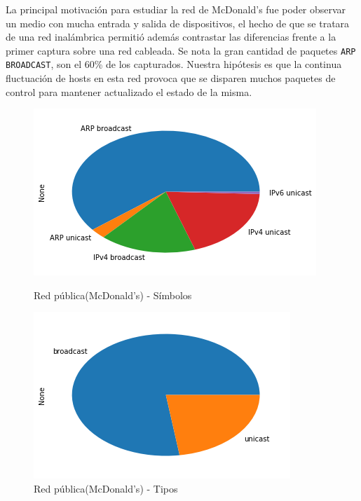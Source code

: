 La principal motivación para estudiar la red de McDonald's fue poder observar un medio con mucha entrada y salida de dispositivos, el hecho de que se tratara de una red inalámbrica permitió además contrastar las diferencias frente a la primer captura sobre una red cableada. Se nota la gran cantidad de paquetes \texttt{ARP BROADCAST}, son el 60\% de los capturados. Nuestra hipótesis es que la continua fluctuación de hosts en esta red provoca que se disparen muchos paquetes de control para mantener actualizado el estado de la misma.

\begin{figure}[H]
	\begin{minipage}{0.49\textwidth}
		\centering
		\includegraphics[width=\linewidth]{imagenes/mac_torta_simbolos}
		\caption{Red pública(McDonald's) - Símbolos}
		\label{mac_torta_simb}
	\end{minipage}
	\begin{minipage}{0.49\textwidth}
		\centering
		\includegraphics[width=\linewidth]{imagenes/mac_torta_tipos}
		\caption{Red pública(McDonald's) - Tipos}
		\label{mac_torta_tipos}
	\end{minipage}
\end{figure}

